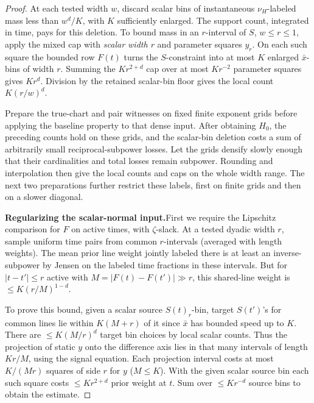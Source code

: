 \begin{proof}
At each tested width \(w\), discard scalar bins of instantaneous
\(\nu_H\)-labeled mass less than \(w^d/K\), with \(K\)
sufficiently enlarged. The support count, integrated in time, pays
for this deletion. To bound mass in an \(r\)-interval of \(S\),
\(w\le r\le1\), apply the mixed cap with \emph{scalar width
\(r\)} and parameter squares \(y_r\). On each such square the
bounded row \(F(t)\) turns the \(S\)-constraint into at most
\(K\) enlarged \(\bar x\)-bins of width \(r\). Summing the
\(Kr^{2+d}\) cap over at most \(Kr^{-2}\) parameter squares
gives \(Kr^d\). Division by the retained scalar-bin floor gives
the local count \(K(r/w)^d\).

Prepare the true-chart and pair witnesses on fixed finite exponent
grids before applying the baseline property to that dense input.
After obtaining \(H_0\), the preceding counts hold on these grids,
and the scalar-bin deletion costs a sum of arbitrarily small
reciprocal-subpower losses. Let the grids densify slowly enough
that their cardinalities and total losses remain subpower. Rounding
and interpolation then give the local counts and caps on the whole
width range. The next two preparations further restrict these
labels, first on finite grids and then on a slower diagonal.

\par\smallskip\noindent\textbf{Regularizing the scalar-normal input.}\quad  First we require the Lipschitz comparison for \(F\) on active times, with \(\zeta\)-slack. At a tested dyadic width \(r\), sample uniform time pairs from common \(r\)-intervals (averaged with length weights). The mean prior line weight jointly labeled there is at least an inverse-subpower by Jensen on the labeled time fractions in these intervals. But for \(|t-t'|\le r\) active with \(M=|F(t)-F(t')|\gg r\), this shared-line weight is \(\le K(r/M)^{1-d}\).

To prove this bound, given a scalar source \(S(t)_r\)-bin, target \(S(t')\)'s for common lines lie within \(K(M+r)\) of it since \(\bar x\) has bounded speed up to \(K\). There are \(\le K(M/r)^d\) target bin choices by local scalar counts. Thus the projection of static \(y\) onto the difference axis lies in that many intervals of length \(K r/M\), using the signal equation. Each projection interval costs at most \(K/(M r)\) squares of side \(r\) for \(y\) (\(M\le K\)). With the given scalar source bin each such square costs \(\le K r^{2+d}\) prior weight at \(t\). Sum over \(\le K r^{-d}\) source bins to obtain the estimate.


\end{proof}
